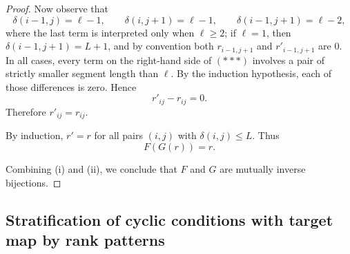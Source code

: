 \documentclass{article}
\theoremstyle{definition}
\begin{document}
\begin{proof}
Now observe that
\[
\delta(i-1,j)=\ell-1,\qquad
\delta(i,j+1)=\ell-1,\qquad
\delta(i-1,j+1)=\ell-2,
\]
where the last term is interpreted only when \(\ell\ge 2\); if \(\ell=1\), then
\(\delta(i-1,j+1)=L+1\), and by convention both \(r_{i-1,j+1}\) and \(r'_{i-1,j+1}\) are \(0\).
In all cases, every term on the right-hand side of \((***)\) involves a pair of strictly smaller
segment length than \(\ell\). By the induction hypothesis, each of those differences is zero.
Hence
\[
r'_{ij}-r_{ij}=0.
\]
Therefore \(r'_{ij}=r_{ij}\).

By induction, \(r'=r\) for all pairs \((i,j)\) with \(\delta(i,j)\le L\). Thus
\[
F(G(r))=r.
\]

Combining (i) and (ii), we conclude that \(F\) and \(G\) are mutually inverse bijections.
\end{proof}
\subsection*{Stratification of cyclic conditions with target map by rank patterns}
\end{document}
